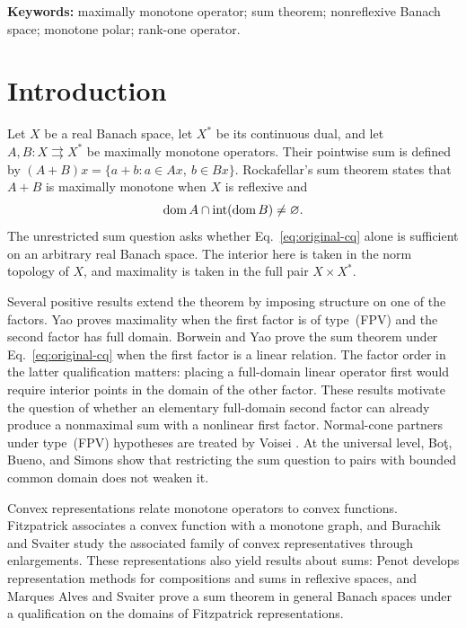 \noindent\textbf{Keywords:} maximally monotone operator; sum theorem;
nonreflexive Banach space; monotone polar; rank-one operator. 

\section{Introduction}
\label{sec:introduction}
Let $X$ be a real Banach space, let $X^*$ be its continuous dual, and let
$A,B:X\rightrightarrows X^*$ be maximally monotone operators. Their pointwise
sum is defined by $(A+B)x=\{a+b:a\in Ax,\ b\in Bx\}$. Rockafellar's sum
theorem \cite{rockafellar1970} states that $A+B$ is maximally monotone when
$X$ is reflexive and
\begin{equation}
\operatorname{dom} A\cap\operatorname{int}(\operatorname{dom} B)\ne\varnothing.
\label{eq:original-cq}
\end{equation}
The unrestricted sum question asks whether Eq.~\eqref{eq:original-cq}
alone is sufficient on an arbitrary real Banach space. The interior here
is taken in the norm topology of $X$, and maximality is taken in the full
pair $X\times X^*$.

Several positive results extend the theorem by imposing structure on one
of the factors. Yao \cite{yao2010} proves maximality when the first factor
is of type~(FPV) and the second factor has full domain. Borwein and Yao
\cite{borweinyao2012} prove the sum theorem under
Eq.~\eqref{eq:original-cq} when the first factor is a linear relation.
The factor order in the latter qualification matters: placing a
full-domain linear operator first would require interior points in the
domain of the other factor. These results motivate the question of
whether an elementary full-domain second factor can already produce a
nonmaximal sum with a nonlinear first factor.
Normal-cone partners under type~(FPV) hypotheses are treated by Voisei
\cite{voisei2010}. At the universal level, Bo\c{t}, Bueno, and Simons
\cite{botbuenosimons2016} show that restricting the sum question to pairs
with bounded common domain does not weaken it.

Convex representations relate monotone operators to convex functions.
Fitzpatrick \cite{fitzpatrick1988} associates a convex function with a
monotone graph, and Burachik and Svaiter \cite{burachiksvaiter2002}
study the associated family of convex representatives through enlargements.
These representations also yield results about sums: Penot
\cite{penot2004} develops representation methods for compositions and
sums in reflexive spaces, and Marques Alves and Svaiter
\cite{marquessvaiter2012} prove a sum theorem in general Banach spaces
under a qualification on the domains of Fitzpatrick representations.

